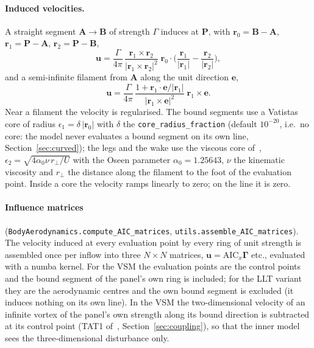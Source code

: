 \documentclass[11pt,a4paper]{article}
\newcommand{\vect}[1]{\mathbf{#1}}
\newcommand{\code}[1]{\texttt{#1}}
\begin{document}
\paragraph{Induced velocities.} A straight segment $\vect A\to\vect B$ of strength $\Gamma$ induces at $\vect P$, with $\vect r_0=\vect B-\vect A$, $\vect r_1=\vect P-\vect A$, $\vect r_2=\vect P-\vect B$,
\begin{equation}
\vect u=\frac{\Gamma}{4\pi}\,\frac{\vect r_1\times\vect r_2}{|\vect r_1\times\vect r_2|^2}\;\vect r_0\cdot\Big(\frac{\vect r_1}{|\vect r_1|}-\frac{\vect r_2}{|\vect r_2|}\Big),
\label{eq:segment}
\end{equation}
and a semi-infinite filament from $\vect A$ along the unit direction $\vect e$,
\begin{equation}
\vect u=\frac{\Gamma}{4\pi}\,\frac{1+\vect r_1\cdot\vect e/|\vect r_1|}{|\vect r_1\times\vect e|^2}\;\vect r_1\times\vect e .
\label{eq:semiinf}
\end{equation}
Near a filament the velocity is regularised. The bound segments use a Vatistas core of radius $\epsilon_1=\delta\,|\vect r_0|$ with $\delta$ the \code{core\_radius\_fraction} (default $10^{-20}$, i.e.\ no core: the model never evaluates a bound segment on its own line, Section~\ref{sec:curved}); the legs and the wake use the viscous core of~\cite{damiani2019}, $\epsilon_2=\sqrt{4\alpha_0\nu\,r_\perp/U}$ with the Oseen parameter $\alpha_0=1.25643$, $\nu$ the kinematic viscosity and $r_\perp$ the distance along the filament to the foot of the evaluation point. Inside a core the velocity ramps linearly to zero; on the line it is zero.

\paragraph{Influence matrices} (\code{BodyAerodynamics.compute\_AIC\_matrices}, \code{utils.assemble\_AIC\_matrices}). The velocity induced at every evaluation point by every ring of unit strength is assembled once per inflow into three $N\times N$ matrices, $\vect u=\mathrm{AIC}_x\boldsymbol\Gamma$ etc., evaluated with a numba kernel. For the VSM the evaluation points are the control points and the bound segment of the panel's own ring is included; for the LLT variant they are the aerodynamic centres and the own bound segment is excluded (it induces nothing on its own line). In the VSM the two-dimensional velocity of an infinite vortex of the panel's own strength along its bound direction is subtracted at its control point (TAT1 of~\cite{gaunaa2026}, Section~\ref{sec:coupling}), so that the inner model sees the three-dimensional disturbance only.
\end{document}
